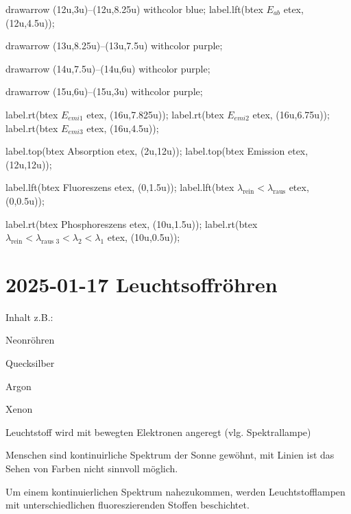 drawarrow (12u,3u)--(12u,8.25u) withcolor blue;
label.lft(btex $E_{ab}$ etex, (12u,4.5u));

drawarrow (13u,8.25u)--(13u,7.5u) withcolor purple;

drawarrow (14u,7.5u)--(14u,6u) withcolor purple;

drawarrow (15u,6u)--(15u,3u) withcolor purple;

label.rt(btex $E_{emi 1}$ etex, (16u,7.825u));
label.rt(btex $E_{emi 2}$ etex, (16u,6.75u));
label.rt(btex $E_{emi 3}$ etex, (16u,4.5u));


label.top(btex Absorption etex, (2u,12u));
label.top(btex Emission etex, (12u,12u));

label.lft(btex Fluoreszens etex, (0,1.5u));
label.lft(btex $\lambda_{\text{rein}} < \lambda_{\text{raus}}$ etex, (0,0.5u));

label.rt(btex Phosphoreszens etex, (10u,1.5u));
label.rt(btex $\lambda_{\text{rein}} < \lambda_{\text{raus }3} < \lambda_2 < \lambda_1$ etex, (10u,0.5u));

\stopMPpage
\stopbuffer


\section{2025-01-17 Leuchtsoffröhren}


Inhalt z.B.:
\startitemize[packed]
\item Neonröhren
\item Quecksilber
\item Argon
\item Xenon
\stopitemize

Leuchtstoff wird mit bewegten Elektronen angeregt (vlg. Spektrallampe)

Menschen sind kontinuirliche Spektrum der Sonne gewöhnt, mit Linien ist das Sehen von Farben nicht sinnvoll möglich.

Um einem kontinuierlichen Spektrum nahezukommen, werden Leuchtstofflampen mit unterschiedlichen fluoreszierenden Stoffen beschichtet. 
